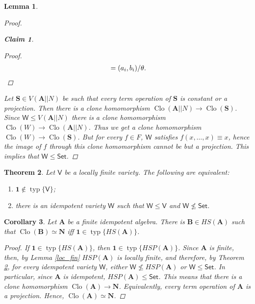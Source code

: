 \documentclass{amsart}
\theoremstyle{plain}
\newtheorem{theorem}{Theorem}[section]
\newtheorem{corollary}[theorem]{Corollary}
\newtheorem{lemma}[theorem]{Lemma}
\newtheorem{claim}{Claim}
\theoremstyle{definition}
\theoremstyle{remark}
\DeclareMathOperator{\Clo}{Clo}
\DeclareMathOperator{\typ}{typ}
\begin{document}
\begin{lemma}
\begin{proof}
\begin{claim}
\begin{proof}
\begin{align*}
                   & = (a_i, b_i) / \theta \text{.} \qedhere \\
                \end{align*}
            \end{proof}
        \end{claim}
        Let $\mathbf{S} \in V(\mathbf{A}||N)$ be such that every term operation of $\mathbf{S}$ is constant or a projection. 
        Then there is a clone homomorphism $\Clo(\mathbf{A}||N) \to \Clo(\mathbf{S})$.
        Since $\mathsf{W} \le V(\mathbf{A}||N)$ there is a clone homomorphism $\Clo(W) \to \Clo(\mathbf{A}||N)$. 
        Thus we get a clone homomorphism $\Clo(W) \to \Clo(\mathbf{S})$. 
        But for every $f \in F$, $\mathsf{W}$ satisfies $f(x, \ldots, x) \equiv x$, hence the image of $f$ through this clone homomorphism cannot be but a projection. 
        This implies that $\mathsf{W} \le \mathsf{Set}$. 
    \end{proof}
\end{lemma}

\begin{theorem}
    \label{omitting_typ1}
    Let $\mathsf{V}$ be a locally finite variety. 
    The following are equivalent: 
    \begin{enumerate}
        \item $\mathbf{1} \notin \typ\{\mathsf{V}\}$; 
        \item there is an idempotent variety $\mathsf{W}$ such that $\mathsf{W} \le \mathsf{V}$ and $\mathsf{W} \nleq \mathsf{Set}$. 
    \end{enumerate}
\end{theorem}

\begin{corollary}
    Let $\mathbf{A}$ be a finite idempotent algebra. 
    There is $\mathbf{B} \in HS(\mathbf{A})$ such that $\Clo(\mathbf{B}) \simeq \mathbf{N}$ iff $\mathbf{1} \in \typ\{HS(\mathbf{A})\}$. 
    \begin{proof}
        If $\mathbf{1} \in \typ\{HS(\mathbf{A})\}$, then $\mathbf{1} \in \typ\{HSP(\mathbf{A})\}$. 
        Since $\mathbf{A}$ is finite, then, by Lemma \ref{loc_fin} $HSP(\mathbf{A})$ is locally finite, 
        and therefore, by Theorem \ref{omitting_typ1}, for every idempotent variety $\mathsf{W}$, either $\mathsf{W} \nleq HSP(\mathbf{A})$ or $\mathsf{W} \le \mathsf{Set}$. 
        In particular, since $\mathbf{A}$ is idempotent, $HSP(\mathbf{A}) \le \mathsf{Set}$. 
        This means that there is a clone homomorphism $\Clo(\mathbf{A}) \to \mathbf{N}$. 
        Equivalently, every term operation of $\mathbf{A}$ is a projection. 
        Hence, $\Clo(\mathbf{A}) \simeq \mathbf{N}$. 

    \end{proof}
\end{corollary}
\end{document}
